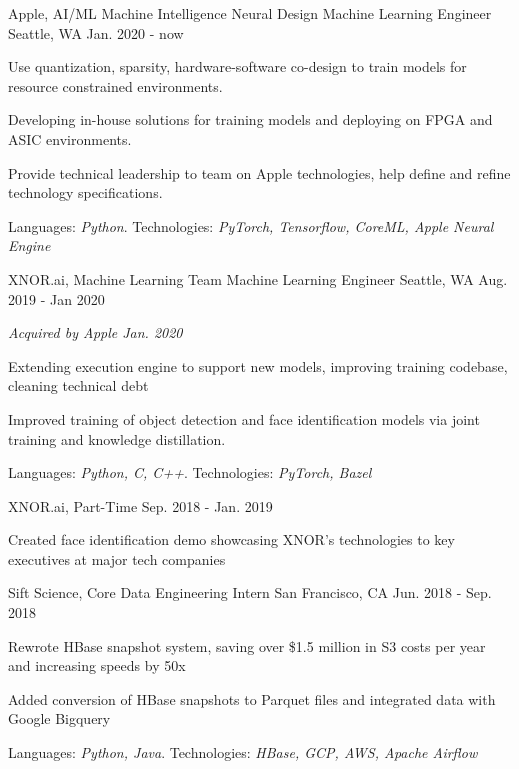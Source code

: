 \begin{cventries}
    \vspace{-0.6em}
  \cventry
    {Apple, AI/ML Machine Intelligence Neural Design}
    {Machine Learning Engineer}
    {Seattle, WA}
    {Jan. 2020 - now}
    {
      \begin{cvitems}
        \item {Use quantization, sparsity, hardware-software co-design to train models for resource constrained environments.}
        \item {Developing in-house solutions for training models and deploying on FPGA and ASIC environments.}
        \item {Provide technical leadership to team on Apple technologies, help define and refine technology specifications.}
        \item {Languages: \textit{Python}. Technologies: \textit{PyTorch, Tensorflow, CoreML, Apple Neural Engine}}
	\vspace{-1em}
      \end{cvitems}
    }

  \cventry
    {XNOR.ai, Machine Learning Team}
    {Machine Learning Engineer}
    {Seattle, WA}
    {Aug. 2019 - Jan 2020}
    {
      \begin{cvitems}
        \item {\textit{Acquired by Apple Jan. 2020}}
        \item {Extending execution engine to support new models, improving training codebase, cleaning technical debt}
        \item {Improved training of object detection and face identification models via joint training and knowledge distillation.}
        \item {Languages: \textit{Python, C, C++}. Technologies: \textit{PyTorch, Bazel}}
	\vspace{-1em}
      \end{cvitems}
    }
  \cventry
    {XNOR.ai, Part-Time}
    {}
    {}
    {Sep. 2018 - Jan. 2019}
    {
      \begin{cvitems}
        \item {Created face identification demo showcasing XNOR's technologies to key executives at major tech companies} 
      \end{cvitems}
    }


    \vspace{-1.2em}
  \cventry
    {Sift Science, Core Data}
    {Engineering Intern}
    {San Francisco, CA}
    {Jun. 2018 - Sep. 2018}
    {
      \begin{cvitems}
        \item {Rewrote HBase snapshot system, saving over \$1.5 million in S3 costs per year and increasing speeds by 50x}
        \item {Added conversion of HBase snapshots to Parquet files and integrated data with Google Bigquery}
        \item {Languages: \textit{Python, Java}. Technologies: \textit{HBase, GCP, AWS, Apache Airflow}}
      \end{cvitems}
    }


\end{cventries}
